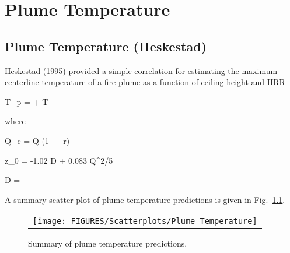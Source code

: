 \chapter{Plume Temperature}

\section{Plume Temperature (Heskestad)}

Heskestad (1995) provided a simple correlation for estimating the maximum centerline temperature of a fire plume as a function of ceiling height and HRR

\be
T_p =  + T_\infty
\ee

\noindent where

\be
\dot Q_c = \dot Q (1 - \chi_r)
\ee

\be
z_0 = -1.02 D + 0.083 \dot Q^{2/5}
\ee

\be
D = 
\ee

\clearpage

A summary scatter plot of plume temperature predictions is given in Fig.~\ref{plume_temperature_summary}. 

\begin{figure}[ht]
\begin{center}
\begin{tabular}{l}
\texttt{[image: FIGURES/Scatterplots/Plume\_Temperature]}
\end{tabular}
\end{center}
\caption[Summary of plume temperature predictions.]
{Summary of plume temperature predictions.}
\label{plume_temperature_summary}
\end{figure}

